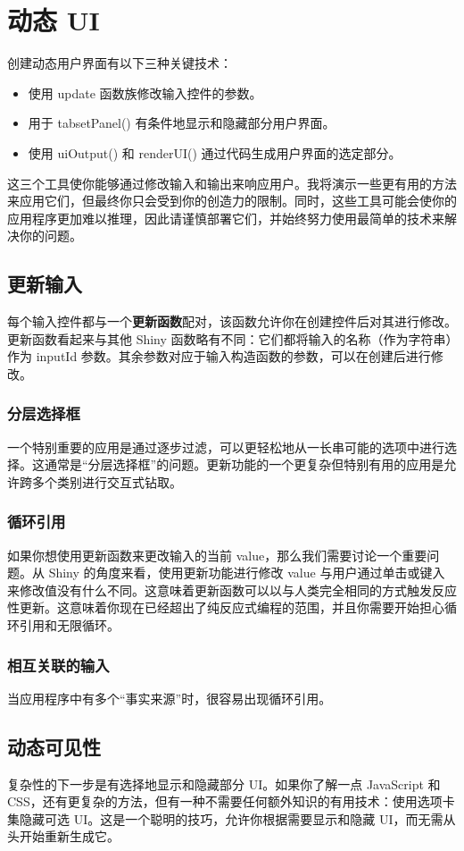 \chapter{动态 UI\label{ch10}}
创建动态用户界面有以下三种关键技术：
\begin{itemize}
    \item 使用 update 函数族修改输入控件的参数。
    \item 用于 tabsetPanel() 有条件地显示和隐藏部分用户界面。
    \item 使用 uiOutput() 和 renderUI() 通过代码生成用户界面的选定部分。
\end{itemize}

这三个工具使你能够通过修改输入和输出来响应用户。我将演示一些更有用的方法来应用它们，但最终你只会受到你的创造力的限制。同时，这些工具可能会使你的应用程序更加难以推理，因此请谨慎部署它们，并始终努力使用最简单的技术来解决你的问题。
\section{更新输入}
每个输入控件都与一个\textbf{更新函数}配对，该函数允许你在创建控件后对其进行修改。更新函数看起来与其他 Shiny 函数略有不同：它们都将输入的名称（作为字符串）作为 inputId 参数。其余参数对应于输入构造函数的参数，可以在创建后进行修改。

\subsection{分层选择框}
一个特别重要的应用是通过逐步过滤，可以更轻松地从一长串可能的选项中进行选择。这通常是“分层选择框”的问题。更新功能的一个更复杂但特别有用的应用是允许跨多个类别进行交互式钻取。
\subsection{循环引用}
如果你想使用更新函数来更改输入的当前 value，那么我们需要讨论一个重要问题。从 Shiny 的角度来看，使用更新功能进行修改 value 与用户通过单击或键入来修改值没有什么不同。这意味着更新函数可以以与人类完全相同的方式触发反应性更新。这意味着你现在已经超出了纯反应式编程的范围，并且你需要开始担心循环引用和无限循环。
\subsection{相互关联的输入}
当应用程序中有多个“事实来源”时，很容易出现循环引用。
\section{动态可见性}
复杂性的下一步是有选择地显示和隐藏部分 UI。如果你了解一点 JavaScript 和 CSS，还有更复杂的方法，但有一种不需要任何额外知识的有用技术：使用选项卡集隐藏可选 UI。这是一个聪明的技巧，允许你根据需要显示和隐藏 UI，而无需从头开始重新生成它。

